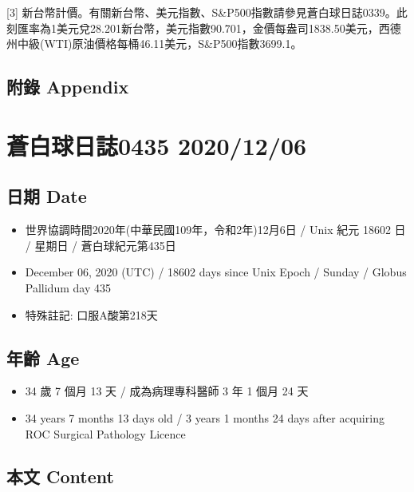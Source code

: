 \documentclass[a5paper, 11pt
]{book}
\providecommand{\tightlist}{%
  \setlength{\itemsep}{0pt}\setlength{\parskip}{0pt}}
\begin{document}
{[}3{]}
新台幣計價。有關新台幣、美元指數、S\&P500指數請參見蒼白球日誌0339。此刻匯率為1美元兌28.201新台幣，美元指數90.701，金價每盎司1838.50美元，西德州中級(WTI)原油價格每桶46.11美元，S\&P500指數3699.1。

\hypertarget{ux9644ux9304-appendix-4}{%
\subsection{附錄 Appendix}\label{ux9644ux9304-appendix-4}}

\hypertarget{ux84bcux767dux7403ux65e5ux8a8c0435-20201206}{%
\section{蒼白球日誌0435
2020/12/06}\label{ux84bcux767dux7403ux65e5ux8a8c0435-20201206}}

\hypertarget{ux65e5ux671f-date-5}{%
\subsection{日期 Date}\label{ux65e5ux671f-date-5}}

\begin{itemize}
\tightlist
\item
  世界協調時間2020年(中華民國109年，令和2年)12月6日 / Unix 紀元 18602 日
  / 星期日 / 蒼白球紀元第435日
\item
  December 06, 2020 (UTC) / 18602 days since Unix Epoch / Sunday /
  Globus Pallidum day 435
\item
  特殊註記: 口服A酸第218天
\end{itemize}

\hypertarget{ux5e74ux9f61-age-5}{%
\subsection{年齡 Age}\label{ux5e74ux9f61-age-5}}

\begin{itemize}
\tightlist
\item
  34 歲 7 個月 13 天 / 成為病理專科醫師 3 年 1 個月 24 天
\item
  34 years 7 months 13 days old / 3 years 1 months 24 days after
  acquiring ROC Surgical Pathology Licence
\end{itemize}

\hypertarget{ux672cux6587-content-5}{%
\subsection{本文 Content}\label{ux672cux6587-content-5}}
\end{document}
